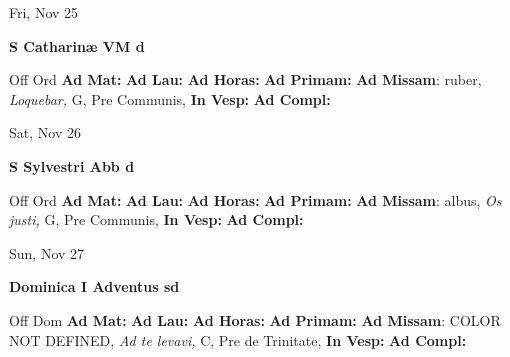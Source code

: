 \documentclass[10pt]{memoir}
\begin{document}
\begin{center}
\begin{minipage}{3.5in}
\vspace{2em}
\begin{center}Fri, Nov 25
\end{center}
\textbf{ \large S Catharinæ VM
\textnormal{\normalsize d}}

\begin{justify}Off Ord
\textbf{Ad Mat: }
\textbf{Ad Lau: }
\textbf{Ad Horas: }
\textbf{Ad Primam: }\textbf{Ad Missam}: ruber, \textit{Loquebar,} G, Pre Communis, 
\textbf{In Vesp: }
\textbf{Ad Compl: }
\end{justify}
\end{minipage}
\end{center}

\begin{center}
\begin{minipage}{3.5in}
\vspace{2em}
\begin{center}Sat, Nov 26
\end{center}
\textbf{ \large S Sylvestri Abb
\textnormal{\normalsize d}}

\begin{justify}Off Ord
\textbf{Ad Mat: }
\textbf{Ad Lau: }
\textbf{Ad Horas: }
\textbf{Ad Primam: }\textbf{Ad Missam}: albus, \textit{Os justi,} G, Pre Communis, 
\textbf{In Vesp: }
\textbf{Ad Compl: }
\end{justify}
\end{minipage}
\end{center}

\begin{center}
\begin{minipage}{3.5in}
\vspace{2em}
\begin{center}Sun, Nov 27
\end{center}
\textbf{ \large Dominica I Adventus
\textnormal{\normalsize sd}}

\begin{justify}Off Dom
\textbf{Ad Mat: }
\textbf{Ad Lau: }
\textbf{Ad Horas: }
\textbf{Ad Primam: }\textbf{Ad Missam}: COLOR NOT DEFINED, \textit{Ad te levavi,} C, Pre de Trinitate, 
\textbf{In Vesp: }
\textbf{Ad Compl: }
\end{justify}
\end{minipage}
\end{center}
\end{document}
